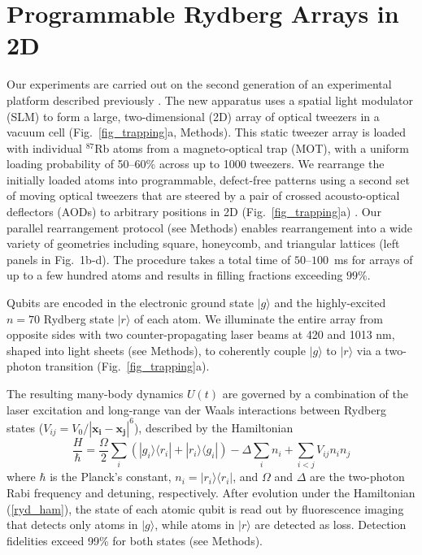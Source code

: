 \documentclass[reprint,twocolumn,secnumarabic,amssymb, aps, prl]{revtex4-1}
\begin{document}
\section{Programmable Rydberg Arrays in 2D}
 
Our experiments are carried out on the second generation of an experimental platform described previously \cite{AtomArrayNature2017}. The new apparatus uses a spatial light modulator (SLM) to form a large, two-dimensional (2D) array of optical tweezers in a vacuum cell (Fig.~\ref{fig_trapping}a, Methods). This static tweezer array is loaded with individual $^{87}$Rb atoms from a magneto-optical trap (MOT), with a uniform loading probability of 50--60\% across  up to 1000 tweezers. We rearrange the initially loaded atoms into programmable, defect-free patterns using a second set of moving optical tweezers that are steered by a pair of crossed acousto-optical deflectors (AODs) to arbitrary positions in 2D (Fig.~\ref{fig_trapping}a) \cite{AntoineAssembly2016}. Our parallel rearrangement protocol (see Methods) enables rearrangement into a wide variety of geometries including square, honeycomb, and triangular lattices (left panels in Fig.~1b-d). The procedure takes a total time of $50$--$100$~ms for arrays of up to a few hundred atoms and results in filling fractions exceeding $99\%$.

Qubits are encoded in the electronic ground state 
$|g\rangle$  and the highly-excited $n = 70$ Rydberg state $|r\rangle$ of each atom. 
We illuminate the entire array from opposite sides with two counter-propagating laser beams at 420 and 1013 nm, shaped into light sheets (see Methods), to coherently couple $|g\rangle$ to $|r\rangle$ via a two-photon transition (Fig.~\ref{fig_trapping}a). 

The resulting many-body dynamics $U(t)$ are governed by a combination of the laser excitation and long-range van der Waals interactions between Rydberg states ($V_{ij} = V_0 / |\mathbf{x_i} - \mathbf{x_j}|^6$), described by the Hamiltonian
\begin{equation}
\frac{H}{\hbar} = \frac{\Omega}{2}\sum_i (|g_i\rangle\langle r_i| + |r_i\rangle\langle g_i|) - \Delta\sum_i n_i + \sum_{i<j} V_{ij}n_i n_j
\label{ryd_ham}
\end{equation}
where $\hbar$ is the  Planck's constant, $n_i = |r_i\rangle \langle r_i|$, and $\Omega$ and $\Delta$ are the two-photon Rabi frequency and detuning, respectively. 
After evolution under the Hamiltonian (\ref{ryd_ham}), the state of each atomic qubit is read out by fluorescence imaging that detects only atoms in $|g\rangle$, while atoms in $|r\rangle$
are detected as loss. Detection fidelities exceed 99\% for both states (see Methods).
\end{document}
